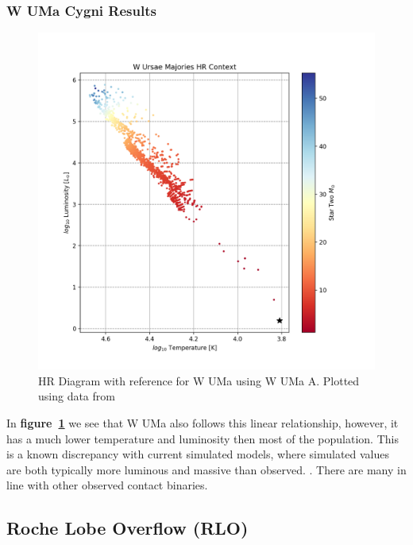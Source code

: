 \documentclass[12pt, a4paper]{article}
\begin{document}
        \subsubsection{W UMa Cygni Results}
            \begin{figure}[H]
                \centering
                \includegraphics[scale = .6]{figs/GeneratedFigs/W_UMa/WUMaHRDiagram.png}
                \caption{HR Diagram with reference for W UMa using W UMa A. Plotted using data from}
                \label{WUMaResults}
            \end{figure}

            In \textbf{figure~\ref{WUMaResults}} we see that W UMa also follows this linear relationship, however, it has a much lower temperature and luminosity then most of the population. This is a known discrepancy with current simulated models, where simulated values are both typically more luminous and massive than observed. \parencite{Fabry_2025}. There are many in line with other observed contact binaries.  

            \subsection{\centering Roche Lobe Overflow (RLO)}
            
\end{document}
